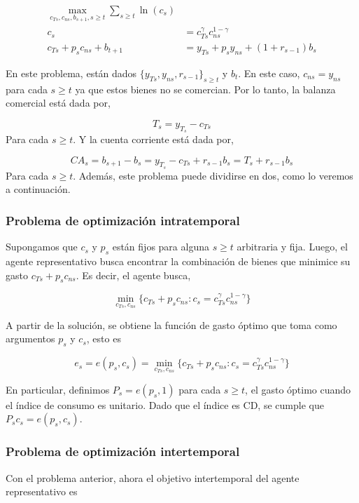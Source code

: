 \documentclass[]{article}
\begin{document}
\[
\begin{align}
\max_{c_{Ts}, c_{ns}, b_{s+1}, s\geq t}  \sum_{s\geq t} \ln(c_s) \\
 c_s &= c_{Ts}^\gamma c_{ns}^{1-\gamma} \\
c_{Ts} + p_sc_{ns} + b_{t+1} &= y_{Ts} + p_sy_{ns} + (1 + r_{s-1})b_s
\end{align}
\]

En este problema, están dados \(\{y_{Ts}, y_{ns}, r_{s-1}\}_{s\geq t}\)
y \(b_t\). En este caso, \(c_{ns} = y_{ns}\) para cada \(s \geq t\) ya
que estos bienes no se comercian. Por lo tanto, la balanza comercial
está dada por,

\[
T_s = y_{T_s} - c_{Ts}
\] Para cada \(s\geq t\). Y la cuenta corriente está dada por,

\[
CA_s = b_{s+1} - b_s = y_{T_s} - c_{Ts} + r_{s-1}b_s = T_s + r_{s-1}b_s
\] Para cada \(s \geq t\). Además, este problema puede dividirse en dos,
como lo veremos a continuación.

\subsubsection{Problema de optimización
intratemporal}\label{problema-de-optimizacion-intratemporal}

Supongamos que \(c_s\) y \(p_s\) están fijos para alguna \(s \geq t\)
arbitraria y fija. Luego, el agente representativo busca encontrar la
combinación de bienes que minimice su gasto \(c_{Ts} + p_s c_{ns}\). Es
decir, el agente busca,

\[
\min_{c_{Ts}, c_{ns}}\{c_{Ts} + p_sc_{ns}: c_s = c_{Ts}^\gamma c_{ns}^{1-\gamma}\}
\]

A partir de la solución, se obtiene la función de gasto óptimo que toma
como argumentos \(p_s\) y \(c_s\), esto es

\[
e_s = e(p_s,c_s) = \min_{c_{Ts}, c_{ns}}\{c_{Ts} + p_sc_{ns}: c_s = c_{Ts}^\gamma c_{ns}^{1-\gamma}\}
\]

En particular, definimos \(P_s = e(p_s, 1)\) para cada \(s \geq t\), el
gasto óptimo cuando el índice de consumo es unitario. Dado que el índice
es CD, se cumple que \(P_s c_s = e(p_s, c_s)\).

\subsubsection{Problema de optimización
intertemporal}\label{problema-de-optimizacion-intertemporal}

Con el problema anterior, ahora el objetivo intertemporal del agente
representativo es
\end{document}
